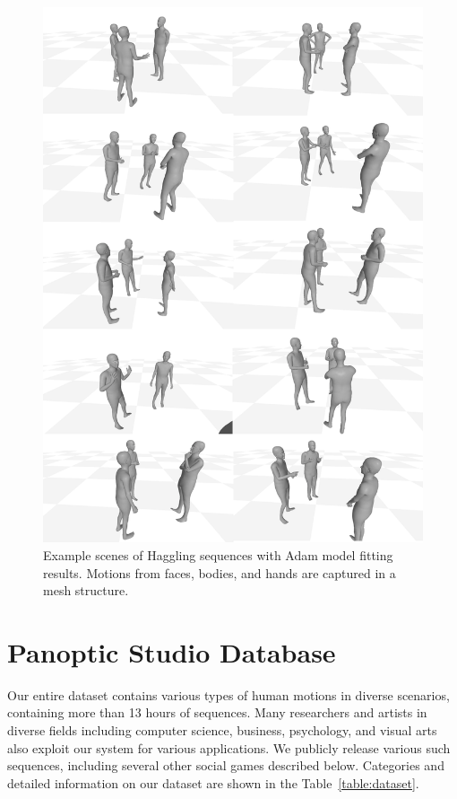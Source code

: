 \begin{figure}
	\centering
	\includegraphics[width=\textwidth]{ssp_fig/haggling_adam}
	\caption{Example scenes of Haggling sequences with Adam model fitting results. Motions from faces, bodies, and hands are captured in a mesh structure.} 
	\label{fig:haggling_measurement_adam}
\end{figure}



\section{Panoptic Studio Database}
Our entire dataset contains various types of human motions in diverse scenarios, containing more than 13 hours of sequences. Many researchers and artists in diverse fields including computer science, business, psychology, and visual arts also exploit our system for various applications. We publicly release various such sequences, including several other social games described below. Categories and detailed information on our dataset are shown in the Table~\ref{table:dataset}.

